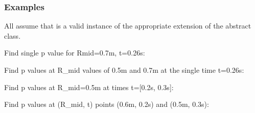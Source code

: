 \documentclass[letterpaper,10pt,english]{sphinxmanual}
\begin{document}
\begin{fulllineitems}
\begin{fulllineitems}
\begin{quote}
\begin{description}
\begin{itemize}
\end{itemize}


\end{description}\end{quote}
\subsubsection*{Examples}

All assume that  is a valid instance of the appropriate
extension of the {\hyperref[\detokenize{eqtools:eqtools.core.Equilibrium}]{}} abstract class.

Find single p value for Rmid=0.7m, t=0.26s:

\begin{sphinxVerbatim}[commandchars=\\\{\}]
   
\end{sphinxVerbatim}

Find p values at R\_mid values of 0.5m and 0.7m at the single time
t=0.26s:

\begin{sphinxVerbatim}[commandchars=\\\{\}]
  \PYG{p}{[} \PYG{p}{]} 
\end{sphinxVerbatim}

Find p values at R\_mid=0.5m at times t={[}0.2s, 0.3s{]}:

\begin{sphinxVerbatim}[commandchars=\\\{\}]
   \PYG{p}{[} \PYG{p}{]}
\end{sphinxVerbatim}

Find p values at (R\_mid, t) points (0.6m, 0.2s) and (0.5m, 0.3s):

\begin{sphinxVerbatim}[commandchars=\\\{\}]
  \PYG{p}{[} \PYG{p}{]} \PYG{p}{[} \PYG{p}{]} 
\end{sphinxVerbatim}


\end{fulllineitems}
\end{fulllineitems}
\end{document}
